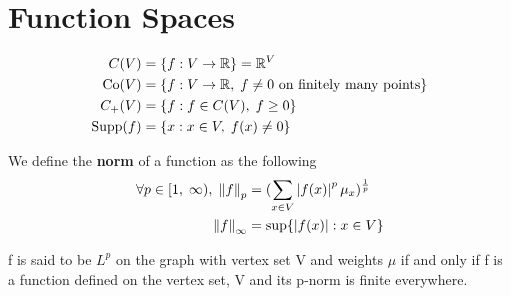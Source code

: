 \documentclass[main]{subfiles}
\begin{document}
\section{Function Spaces}
\begin{definition}
    \begin{align*}
        C(V)     & = \{f: V \to \mathbb R\} = \mathbb R^V                                     \\
        \operatorname{Co}(V)   & = \{f: V \to \mathbb R,\;f \neq 0 \text{ on finitely many points}\} \\
        C_+(V)   & = \{f: f \in C(V),\;f \geq 0\}                               \\
        \operatorname{Supp}(f) & = \{x: x \in V,\;f(x) \neq 0\}                               \\
    \end{align*}
\end{definition}
\begin{definition}
    We define the \textbf{norm} of a function as the following
    \begin{align*}
        \forall p \in [1,\;\infty),\;\left\lVert f\right\rVert_{p} & = (\sum_{x \in V}\left\lvert f(x)\right\rvert^p \mu_x)^{\frac{1}{p}} \\
        \left\lVert f\right\rVert_{\infty}                         & = \sup\{{\left\lvert f(x)\right\rvert: x \in V}\}
    \end{align*}
\end{definition}
f is said to be $L^p$ on the graph with vertex set V and weights $\mu$ if and only if f is a function defined on the vertex set, V and its p-norm is finite everywhere.
\end{document}
